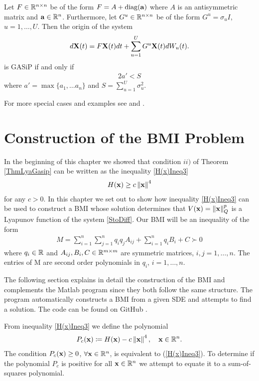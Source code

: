 \documentclass[a4paper,12pt,twoside,BCOR=10mm]{scrbook}
\begin{document}
\begin{theorem}\label{ThmSpecialCaseAlmennast}
Let $F \in \mathbb{R}^{n\times n}$ be of the form $F = A + \operatorname{diag}(\mathbf{a})$ where $A$ is an antisymmetric matrix and $\mathbf{a}\in\mathbb{R}^{n}$. Furthermore, let $G^u \in \mathbb{R}^{n \times n}$ be of the form $G^u = \sigma_u I$, $u = 1,\ldots, U$. Then the origin of the system
\begin{align*}
    d\mathbf{X}(t) = F\mathbf{X}(t)dt + \sum_{u=1}^U G^u\mathbf{X}(t)dW_u(t).
\end{align*}
is GASiP if and only if
\begin{align*}
    2a' < S
\end{align*}
where $a' = \max\{a_1, \ldots a_n\}$ and $S = \sum\limits_{u = 1}^U \sigma_u^2$.
\end{theorem}

For more special cases and examples see \citep{HGGS2018localLya} and \citep{sdestab2012khaminskii}.

\section{Construction of the BMI Problem}\label{SectionConstrBMIProblem}
In the beginning of this chapter we showed that condition $ii)$ of Theorem \ref{ThmLyaGasip} can be written as the inequality \eqref{H(x)Ineq3}
\begin{align*}
    H(\mathbf{x}) \geq c\left\lVert\mathbf{x}\right\rVert^4
\end{align*}
for any $c > 0$.
In this chapter we set out to show how inequality \eqref{H(x)Ineq3} can be used to construct a BMI whose solution determines that $V(\mathbf{x}) = \left\lVert\mathbf{x}\right\rVert_Q^p$ is a Lyapunov function of the system \eqref{StoDiff}. Our BMI will be an inequality of the form
\begin{align*}
    M = \sum_{i = 1}^n \sum_{j = 1}^n q_iq_j A_{ij} + \sum_{i = 1}^n q_i B_i + C \succ 0
\end{align*}
where $q_i \in \mathbb{R}^{}$ and $A_{ij}, B_i, C \in \mathbb{R}^{m \times m}$ are symmetric matrices, $i,j = 1, \ldots, n$. The entries of M are second order polynomials in $q_i$, $i = 1, \ldots, n$.

The following section explains in detail the construction of the BMI and complements the Matlab program since they both follow the same structure. The program automatically constructs a BMI from a given SDE and attempts to find a solution. The code can be found on GitHub \citep{Mverk2022}.

From inequality \eqref{H(x)Ineq3} we define the polynomial
\begin{align}\label{P_c definition}
    P_c(\mathbf{x}) \coloneqq H(\mathbf{x}) - c\left\lVert\mathbf{x}\right\rVert_{}^{4}, \quad \mathbf{x}\in \mathbb{R}^{n}.
\end{align}
The condition $P_c(\mathbf{x}) \geq 0$, $\forall \mathbf{x} \in \mathbb{R}^{n}$, is equivalent to (\ref{H(x)Ineq3}). To determine if the polynomial $P_c$ is positive for all $\mathbf{x} \in \mathbb{R}^{n}$ we attempt to equate it to a sum-of-squares polynomial.
\end{document}
